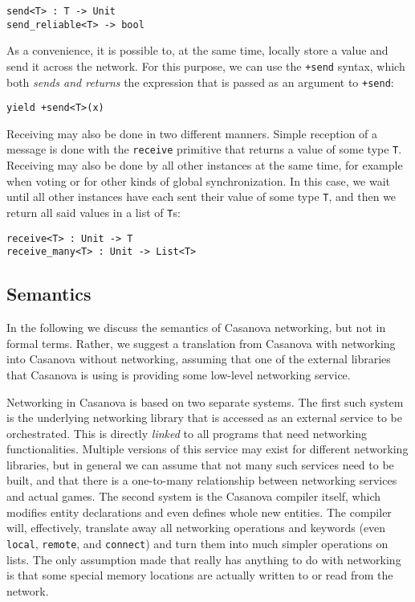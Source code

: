 \begin{lstlisting}
send<T> : T -> Unit
send_reliable<T> -> bool
\end{lstlisting}

As a convenience, it is possible to, at the same time, locally store a value and send it across the network. For this purpose, we can use the \texttt{+send} syntax, which both \textit{sends and returns} the expression that is passed as an argument to \texttt{+send}:

\begin{lstlisting}
yield +send<T>(x)
\end{lstlisting}

Receiving may also be done in two different manners. Simple reception of a message is done with the \texttt{receive} primitive that returns a value of some type \texttt{T}. Receiving may also be done by all other instances at the same time, for example when voting or for other kinds of global synchronization. In this case, we wait until all other instances have each sent their value of some type \texttt{T}, and then we return all said values in a list of \texttt{T}s:

\begin{lstlisting}
receive<T> : Unit -> T
receive_many<T> : Unit -> List<T>
\end{lstlisting}

\subsection{Semantics}
In the following we discuss the semantics of Casanova networking, but not in formal terms. Rather, we suggest a translation from Casanova with networking into Casanova without networking, assuming that one of the external libraries that Casanova is using is providing some low-level networking service.

Networking in Casanova is based on two separate systems. The first such system is the underlying networking library that is accessed as an external service to be orchestrated. This is directly \textit{linked} to all programs that need networking functionalities. Multiple versions of this service may exist for different networking libraries, but in general we can assume that not many such services need to be built, and that there is a one-to-many relationship between networking services and actual games. The second system is the Casanova compiler itself, which modifies entity declarations and even defines whole new entities. The compiler will, effectively, translate away all networking operations and keywords (even \texttt{local}, \texttt{remote}, and \texttt{connect}) and turn them into much simpler operations on lists. The only assumption made that really has anything to do with networking is that some special memory locations are actually written to or read from the network.

